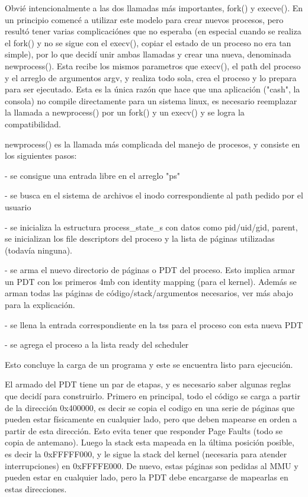 Obvié intencionalmente a las dos llamadas más importantes, fork() y execve().
En un principio comencé a utilizar este modelo para crear nuevos procesos, pero
resultó tener varias complicaciónes que no esperaba (en especial cuando se
realiza el fork() y no se sigue con el execv(), copiar el estado de un proceso
no era tan simple), por lo que decidí unir ambas llamadas y crear una nueva,
denominada newprocess(). Esta recibe los mismos parametros que execv(), el path
del proceso y el arreglo de argumentos argv, y realiza todo sola, crea el
proceso y lo prepara para ser ejecutado. Esta es la única razón que hace que
una aplicación ("cash", la consola) no compile directamente para un sistema
linux, es necesario reemplazar la llamada a newprocess() por un fork() y un
execv() y se logra la compatibilidad.

newprocess() es la llamada más complicada del manejo de procesos, y consiste en
los siguientes pasos:

- se consigue una entrada libre en el arreglo "ps"

- se busca en el sistema de archivos el inodo correspondiente al path pedido
por el usuario

- se inicializa la estructura process\_state\_s con datos como pid/uid/gid,
parent, se inicializan los file descriptors del proceso y la lista de páginas
utilizadas (todavía ninguna).

- se arma el nuevo directorio de páginas o PDT del proceso. Esto implica armar
un PDT con los primeros 4mb con identity mapping (para el kernel). Además se
arman todas las páginas de código/stack/argumentos necesarios, ver más abajo
para la explicación.

- se llena la entrada correspondiente en la tss para el proceso con esta nueva
PDT

- se agrega el proceso a la lista ready del scheduler

Esto concluye la carga de un programa y este se encuentra listo para ejecución.

El armado del PDT tiene un par de etapas, y es necesario saber algunas reglas
que decidí para construirlo. Primero en principal, todo el código se carga a
partir de la dirección 0x400000, es decir se copia el codigo en una serie de
páginas que pueden estar físicamente en cualquier lado, pero que deben mapearse
en orden a partir de esta dirección. Esto evita tener que responder Page Faults
(todo se copia de antemano). Luego la stack esta mapeada en la última posición
posible, es decir la 0xFFFFF000, y le sigue la stack del kernel (necesaria para
atender interrupciones) en 0xFFFFE000. De nuevo, estas páginas son pedidas al
MMU y pueden estar en cualquier lado, pero la PDT debe encargarse de mapearlas
en estas direcciones.

